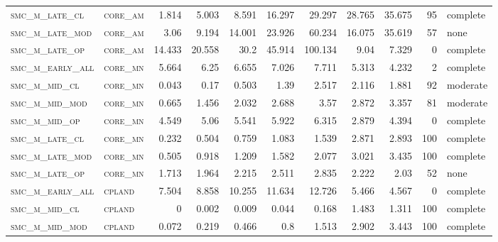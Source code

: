 \begin{landscape}
\begin{center}
\begin{footnotesize}
\begin{longtable}{llrrrrr|rrr}
\textsc{smc\_m\_late\_cl  } & \textsc{core\_am  }   & 1.814    & 5.003    & 8.591    & 16.297   & 29.297   & 28.765      & 35.675        & 95            & complete \\
\textsc{smc\_m\_late\_mod } & \textsc{core\_am  }   & 3.06     & 9.194    & 14.001   & 23.926   & 60.234   & 16.075      & 35.619        & 57            & none \\
\textsc{smc\_m\_late\_op  } & \textsc{core\_am  }   & 14.433   & 20.558   & 30.2     & 45.914   & 100.134  & 9.04        & 7.329         & 0             & complete     \\
\textsc{smc\_m\_early\_all} & \textsc{core\_mn  }   & 5.664    & 6.25     & 6.655    & 7.026    & 7.711    & 5.313       & 4.232         & 2             & complete \\
\textsc{smc\_m\_mid\_cl   } & \textsc{core\_mn  }   & 0.043    & 0.17     & 0.503    & 1.39     & 2.517    & 2.116       & 1.881         & 92            & moderate \\
\textsc{smc\_m\_mid\_mod  } & \textsc{core\_mn  }   & 0.665    & 1.456    & 2.032    & 2.688    & 3.57     & 2.872       & 3.357         & 81            & moderate \\
\textsc{smc\_m\_mid\_op   } & \textsc{core\_mn  }   & 4.549    & 5.06     & 5.541    & 5.922    & 6.315    & 2.879       & 4.394         & 0             & complete     \\
\textsc{smc\_m\_late\_cl  } & \textsc{core\_mn  }   & 0.232    & 0.504    & 0.759    & 1.083    & 1.539    & 2.871       & 2.893         & 100           & complete \\
\textsc{smc\_m\_late\_mod } & \textsc{core\_mn  }   & 0.505    & 0.918    & 1.209    & 1.582    & 2.077    & 3.021       & 3.435         & 100           & complete \\
\textsc{smc\_m\_late\_op  } & \textsc{core\_mn  }   & 1.713    & 1.964    & 2.215    & 2.511    & 2.835    & 2.222       & 2.03          & 52            & none \\
\textsc{smc\_m\_early\_all} & \textsc{cpland    }   & 7.504    & 8.858    & 10.255   & 11.634   & 12.726   & 5.466       & 4.567         & 0             & complete     \\
\textsc{smc\_m\_mid\_cl   } & \textsc{cpland    }   & 0        & 0.002    & 0.009    & 0.044    & 0.168    & 1.483       & 1.311         & 100           & complete \\
\textsc{smc\_m\_mid\_mod  } & \textsc{cpland    }   & 0.072    & 0.219    & 0.466    & 0.8      & 1.513    & 2.902       & 3.443         & 100           & complete \\

\end{longtable}
\end{footnotesize}
\end{center}
\end{landscape}
